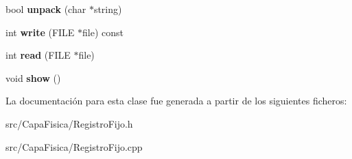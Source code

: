 \begin{DoxyCompactItemize}
\item 
\hypertarget{class_registro_fijo_a2f2a635a7170b6fa6567cd47f824f40d}{bool {\bfseries unpack} (char $\ast$string)}\label{class_registro_fijo_a2f2a635a7170b6fa6567cd47f824f40d}

\item 
\hypertarget{class_registro_fijo_a3c6d6017872280d71952165237da3174}{int {\bfseries write} (\-F\-I\-L\-E $\ast$file) const }\label{class_registro_fijo_a3c6d6017872280d71952165237da3174}

\item 
\hypertarget{class_registro_fijo_abaf3a59b506a626c304788a181c221e3}{int {\bfseries read} (\-F\-I\-L\-E $\ast$file)}\label{class_registro_fijo_abaf3a59b506a626c304788a181c221e3}

\item 
\hypertarget{class_registro_fijo_a077dad50d833fed1d295c7cfea1db57f}{void {\bfseries show} ()}\label{class_registro_fijo_a077dad50d833fed1d295c7cfea1db57f}

\end{DoxyCompactItemize}


\-La documentación para esta clase fue generada a partir de los siguientes ficheros\-:\begin{DoxyCompactItemize}
\item 
src/\-Capa\-Fisica/\-Registro\-Fijo.\-h\item 
src/\-Capa\-Fisica/\-Registro\-Fijo.\-cpp\end{DoxyCompactItemize}
